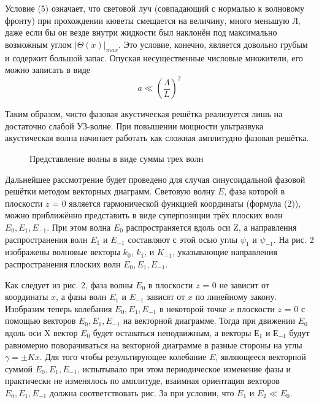 \documentclass[14pt]{article}
\begin{document}
Условие (5) означает, что световой луч (совпадающий с нормалью к волновому фронту) при прохождении кюветы смещается на величину, много меньшую Л, даже если бы он везде внутри жидкости был наклонён под максимально возможным углом $|\Theta(x)|_{max}$. Это условие, конечно, является довольно грубым и содержит большой запас. Опуская несущественные числовые множители, его можно записать в виде
\begin{equation}
	a \ll \left(\frac{\Lambda}{L}\right)^2
\end{equation}

Таким образом, чисто фазовая акустическая решётка реализуется лишь на достаточно слабой УЗ-волне. При повышении мощности ультразвука акустическая волна начинает работать как сложная амплитудно фазовая решётка.

\begin{figure}[h!]
	\caption{Представление волны в виде суммы трех волн}
	\label{fig:image}
\end{figure}

Дальнейшее рассмотрение будет проведено для случая синусоидальной фазовой решётки методом векторных диаграмм. Световую волну $E$, фаза которой в плоскости $z$ = 0 является гармонической функцией координаты (формула (2)), можно приближённо представить в виде суперпозиции трёх плоских волн $E_0, E_1, E_{-1}$. При этом волна $E_0$ распространяется вдоль оси Z, а направления распространения волн $E_1$ и $E_{-1}$ составляют с этой осью углы $\psi_1$ и $\psi_{-1}$. На рис. 2 изображены волновые векторы
$k_0$, $k_1$, и $K_{-1}$, указывающие направления распространения плоских волн $E_0, E_1, E_{-1}$.

Как следует из рис. 2, фаза волны $E_0$ в плоскости $z$ = 0 не зависит от координаты $x$, а фазы волн $E_1$ и $E_{-1}$ зависят от $x$ по линейному закону. Изобразим теперь колебания $E_0, E_1, E_{-1}$ в некоторой точке $x$ плоскости $z$ = 0 с помощью векторов $E_0, E_1, E_{-1}$ на векторной диаграмме. Тогда при движении $E_0$ вдоль оси X вектор $E_0$ будет оставаться неподвижным, а векторы $Е_1$ и $Е_{-1}$ будут равномерно поворачиваться на векторной диаграмме в разные стороны на углы $\gamma = \pm Kx$. Для того чтобы результирующее колебание $E$, являющееся векторной суммой $E_0, E_1, E_{-1}$, испытывало при этом периодическое изменение фазы и практически не изменялось по амплитуде, взаимная ориентация векторов $E_0, E_1, E_{-1}$ должна соответствовать рис. За при условии, что $E_1$ и $E_2 \ll E_0$.
\end{document}
